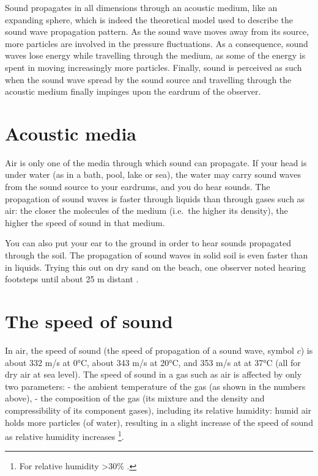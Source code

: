 \documentclass[
]{book}
\begin{document}
Sound propagates in all dimensions through an acoustic medium, like an expanding sphere, which is indeed the theoretical model used to describe the sound wave propagation pattern. As the sound wave moves away from its source, more particles are involved in the pressure fluctuations. As a consequence, sound waves lose energy while travelling through the medium, as some of the energy is spent in moving increasingly more particles. Finally, sound is perceived as such when the sound wave spread by the sound source and travelling through the acoustic medium finally impinges upon the eardrum of the observer.

\section{Acoustic media}\label{acoustic-media}

Air is only one of the media through which sound can propagate. If your head is under water (as in a bath, pool, lake or sea), the water may carry sound waves from the sound source to your eardrums, and you do hear sounds. The propagation of sound waves is faster through liquids than through gases such as air: the closer the molecules of the medium (i.e.~the higher its density), the higher the speed of sound in that medium.

You can also put your ear to the ground in order to hear sounds propagated through the soil. The propagation of sound waves in solid soil is even faster than in liquids. Trying this out on dry sand on the beach, one observer noted hearing footsteps until about 25 m distant \citep[§10]{Minnaert_1970v2}.

\section{The speed of sound}\label{sec:speedofsound}

In air, the speed of sound (the speed of propagation of a sound wave, symbol \(c\)) is about 332 m/s at 0°C, about 343 m/s at 20°C, and 353 m/s at at 37°C \citep{Shadle_2010} (all for dry air at sea level).
The speed of sound in a gas such as air is affected by only two parameters:
- the ambient temperature of the gas (as shown in the numbers above),
- the composition of the gas (its mixture and the density and compressibility of its component gases), including its relative humidity: humid air holds more particles (of water), resulting in a slight increase of the speed of sound as relative humidity increases \citep{Harris_1971}\footnote{For relative humidity \textgreater30\% \citep{Harris_1971}.}.
\end{document}
